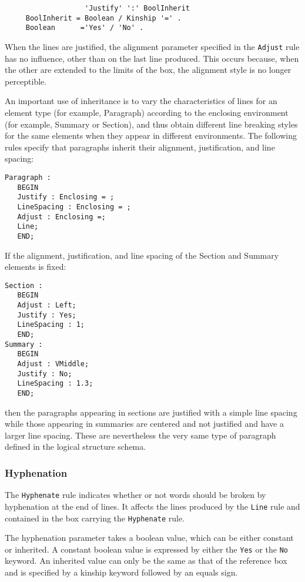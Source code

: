 \begin{verbatim}
                   'Justify' ':' BoolInherit
     BoolInherit = Boolean / Kinship '=' .
     Boolean      ='Yes' / 'No' .
\end{verbatim}

When the lines are justified, the alignment parameter specified in the
{\tt Adjust} rule has no influence, other than on the last line
produced.  This occurs because, when the other are extended to the
limits of the box, the alignment style is no longer perceptible.

\begin{example}
An important use of inheritance is to vary the characteristics of
lines for an element type (for example, Paragraph) according to the
enclosing environment (for example, Summary or Section), and thus
obtain different line breaking styles for the same elements when they
appear in different environments.  The following rules specify that
paragraphs inherit their alignment, justification, and line spacing:
\begin{verbatim}
Paragraph :
   BEGIN
   Justify : Enclosing = ;
   LineSpacing : Enclosing = ;
   Adjust : Enclosing =;
   Line;
   END;
\end{verbatim}
If the alignment, justification, and line spacing of the Section
and Summary  elements is fixed:
\begin{verbatim}
Section :
   BEGIN
   Adjust : Left;
   Justify : Yes;
   LineSpacing : 1;
   END;
Summary :
   BEGIN
   Adjust : VMiddle;
   Justify : No;
   LineSpacing : 1.3;
   END;
\end{verbatim}
then the paragraphs appearing in sections are justified with a simple
line spacing while those appearing in summaries are centered and not
justified and have a larger line spacing.  These are nevertheless the
very same type of paragraph defined in the logical structure schema.
\end{example}

\subsubsection{Hyphenation}
\label{reglehyphenate}

The {\tt Hyphenate} rule indicates whether or not words should be
broken by hyphenation at the end of lines.  It affects the lines
produced by the {\tt Line} rule and contained in the box carrying the
{\tt Hyphenate} rule.

The hyphenation parameter takes a boolean value, which can be either
constant or inherited.  A constant boolean value is expressed by
either the {\tt Yes} or the {\tt No} keyword.  An inherited value can
only be the same as that of the reference box and is specified by a
kinship keyword followed by an equals sign.

